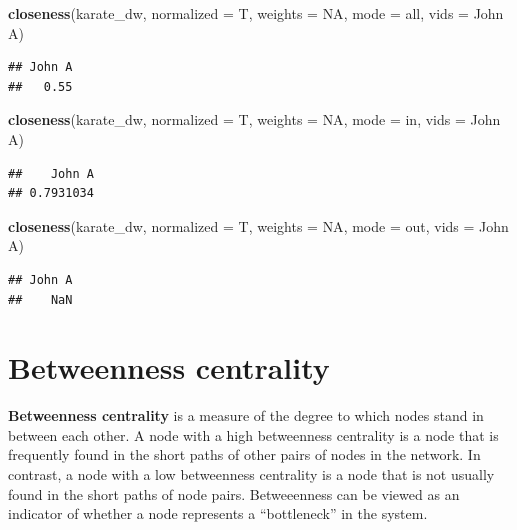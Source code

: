 \documentclass[
]{book}
\newenvironment{Shaded}{\begin{snugshade}}{\end{snugshade}}
\newcommand{\AttributeTok}[1]{\textcolor[rgb]{0.13,0.29,0.53}{#1}}
\newcommand{\ConstantTok}[1]{\textcolor[rgb]{0.56,0.35,0.01}{#1}}
\newcommand{\FunctionTok}[1]{\textcolor[rgb]{0.13,0.29,0.53}{\textbf{#1}}}
\newcommand{\NormalTok}[1]{#1}
\newcommand{\StringTok}[1]{\textcolor[rgb]{0.31,0.60,0.02}{#1}}
\begin{document}
\begin{Shaded}
\begin{Highlighting}[]
\FunctionTok{closeness}\NormalTok{(karate\_dw, }\AttributeTok{normalized =}\NormalTok{ T, }\AttributeTok{weights =} \ConstantTok{NA}\NormalTok{, }\AttributeTok{mode =} \StringTok{\textquotesingle{}all\textquotesingle{}}\NormalTok{, }\AttributeTok{vids =} \StringTok{\textquotesingle{}John A\textquotesingle{}}\NormalTok{)}
\end{Highlighting}
\end{Shaded}

\begin{verbatim}
## John A 
##   0.55
\end{verbatim}

\begin{Shaded}
\begin{Highlighting}[]
\FunctionTok{closeness}\NormalTok{(karate\_dw, }\AttributeTok{normalized =}\NormalTok{ T, }\AttributeTok{weights =} \ConstantTok{NA}\NormalTok{, }\AttributeTok{mode =} \StringTok{\textquotesingle{}in\textquotesingle{}}\NormalTok{, }\AttributeTok{vids =} \StringTok{\textquotesingle{}John A\textquotesingle{}}\NormalTok{)}
\end{Highlighting}
\end{Shaded}

\begin{verbatim}
##    John A 
## 0.7931034
\end{verbatim}

\begin{Shaded}
\begin{Highlighting}[]
\FunctionTok{closeness}\NormalTok{(karate\_dw, }\AttributeTok{normalized =}\NormalTok{ T, }\AttributeTok{weights =} \ConstantTok{NA}\NormalTok{, }\AttributeTok{mode =} \StringTok{\textquotesingle{}out\textquotesingle{}}\NormalTok{, }\AttributeTok{vids =} \StringTok{\textquotesingle{}John A\textquotesingle{}}\NormalTok{)}
\end{Highlighting}
\end{Shaded}

\begin{verbatim}
## John A 
##    NaN
\end{verbatim}

\section{Betweenness centrality}\label{betweenness-centrality}

\textbf{Betweenness centrality} is a measure of the degree to which nodes stand in between each other. A node with a high betweenness centrality is a node that is frequently found in the short paths of other pairs of nodes in the network. In contrast, a node with a low betweenness centrality is a node that is not usually found in the short paths of node pairs. Betweeenness can be viewed as an indicator of whether a node represents a ``bottleneck'' in the system.
\end{document}
